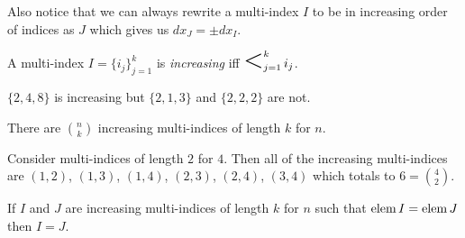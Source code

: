 \documentclass[notes]{subfiles}
\begin{document}
Also notice that we can always rewrite a multi-index $I$ to be in increasing order of indices as $J$ which gives us $dx_J = \pm dx_I$.

\begin{definition}
    A multi-index $I = \{ i_j \}_{j = 1}^k$ is \textit{increasing} iff $\bigless_{j = 1}^{k} i_j$.
\end{definition}

\begin{example}
    $\{ 2, 4, 8 \}$ is increasing but $\{ 2, 1, 3 \}$ and $\{ 2, 2, 2 \}$ are not.
\end{example}

\begin{lemma}
    There are $\binom{n}{k}$ increasing multi-indices of length $k$ for $n$.
\end{lemma}

\begin{example}
    Consider multi-indices of length $2$ for $4$. Then all of the increasing multi-indices are $(1, 2)$, $(1, 3)$, $(1, 4)$, $(2, 3)$, $(2, 4)$, $(3, 4)$ which totals to $6 = \binom{4}{2}$.
\end{example}

\begin{lemma} \label{increasing_characteristic_lemma}
    If $I$ and $J$ are increasing multi-indices of length $k$ for $n$ such that $\operatorname{elem} I = \operatorname{elem} J$ then $I = J$.
\end{lemma}
\end{document}
